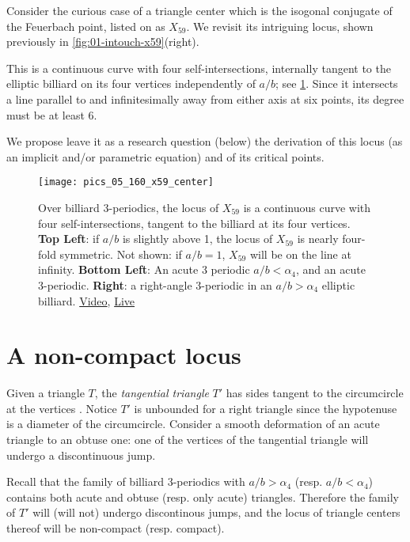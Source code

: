Consider the curious case of a triangle center which is the isogonal conjugate of the Feuerbach point, listed on \cite{etc} as $X_{59}$. We revisit its intriguing locus, shown previously in \cref{fig:01-intouch-x59}(right).

This is a continuous curve with four self-intersections, internally tangent to the elliptic billiard on its four vertices independently of $a/b$; see \cref{fig:05-x59-locus}. Since it intersects a line parallel to and infinitesimally away from either axis at six points, its degree must be at least 6.

We propose leave it as a research question (below) the derivation of this locus (as an implicit and/or parametric equation) and of its critical points. 

\begin{figure}
    \centering
    \texttt{[image: pics\_05\_160\_x59\_center]}
    \caption{Over billiard 3-periodics, the locus of $X_{59}$ is a continuous curve with four self-intersections, tangent to the billiard at its four vertices. \textbf{Top Left}: if $a/b$ is slightly above 1, the locus of  $X_{59}$ is nearly four-fold symmetric. Not shown: if $a/b=1$, $X_{59}$ will be on the line at infinity. \textbf{Bottom Left}: An acute 3 periodic $a/b<\alpha_4$, and an acute 3-periodic. \textbf{Right}: a right-angle 3-periodic in an $a/b>\alpha_4$ elliptic billiard. \href{https://youtu.be/pl_PqSuhlx0}{Video}, \href{https://bit.ly/3fvDlZd}{Live}}
    \label{fig:05-x59-locus}
\end{figure}


\section{A non-compact locus}

Given a triangle $T$, the {\em tangential triangle} $T'$ has sides tangent to the circumcircle at the vertices \cite[Tangential triangle]{mw}. Notice $T'$ is unbounded for a right triangle since the hypotenuse is a diameter of the circumcircle. Consider a smooth deformation of an acute triangle to an obtuse one: one of the vertices of the tangential triangle will undergo a discontinuous jump.

Recall that the family of billiard 3-periodics with $a/b>\alpha_4$ (resp. $a/b<\alpha_4$) contains both acute and obtuse (resp. only acute) triangles. Therefore the family of $T'$ will (will not) undergo discontinous jumps, and the locus of triangle centers thereof will be non-compact (resp. compact).


